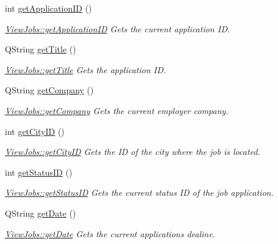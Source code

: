 \begin{DoxyCompactItemize}
int \mbox{\hyperlink{class_view_jobs_a086650882ad80acb4074cf697f8cddcb}{get\+Application\+ID}} ()
\begin{DoxyCompactList}\small\item\em \mbox{\hyperlink{class_view_jobs_a086650882ad80acb4074cf697f8cddcb}{View\+Jobs\+::get\+Application\+ID}} Gets the current application ID. \end{DoxyCompactList}\item 
Q\+String \mbox{\hyperlink{class_view_jobs_ae78f119d37c77a9e3e457ecfd78d7de3}{get\+Title}} ()
\begin{DoxyCompactList}\small\item\em \mbox{\hyperlink{class_view_jobs_ae78f119d37c77a9e3e457ecfd78d7de3}{View\+Jobs\+::get\+Title}} Gets the application ID. \end{DoxyCompactList}\item 
Q\+String \mbox{\hyperlink{class_view_jobs_a88d7c0a7a79bc7a7e02b524587983bf8}{get\+Company}} ()
\begin{DoxyCompactList}\small\item\em \mbox{\hyperlink{class_view_jobs_a88d7c0a7a79bc7a7e02b524587983bf8}{View\+Jobs\+::get\+Company}} Gets the current employer company. \end{DoxyCompactList}\item 
int \mbox{\hyperlink{class_view_jobs_adcafeca350b21a033aa630e042ee7947}{get\+City\+ID}} ()
\begin{DoxyCompactList}\small\item\em \mbox{\hyperlink{class_view_jobs_adcafeca350b21a033aa630e042ee7947}{View\+Jobs\+::get\+City\+ID}} Gets the ID of the city where the job is located. \end{DoxyCompactList}\item 
int \mbox{\hyperlink{class_view_jobs_a91696fde9f0a663bae929390aac8324b}{get\+Status\+ID}} ()
\begin{DoxyCompactList}\small\item\em \mbox{\hyperlink{class_view_jobs_a91696fde9f0a663bae929390aac8324b}{View\+Jobs\+::get\+Status\+ID}} Gets the current status ID of the job application. \end{DoxyCompactList}\item 
Q\+String \mbox{\hyperlink{class_view_jobs_af046f9201cc6031e070b4f9b613a35f9}{get\+Date}} ()
\begin{DoxyCompactList}\small\item\em \mbox{\hyperlink{class_view_jobs_af046f9201cc6031e070b4f9b613a35f9}{View\+Jobs\+::get\+Date}} Gets the current application\textquotesingle{}s dealine. \end{DoxyCompactList}\item 

\end{DoxyCompactItemize}

